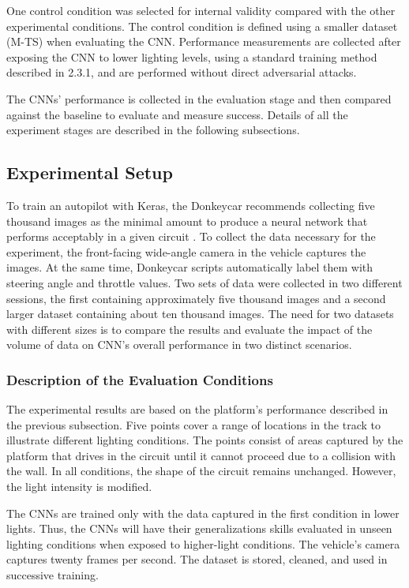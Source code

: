 \documentclass[12pt]{article}
\begin{document}
One control condition was selected for internal validity compared with the other experimental conditions. The control condition is defined using a smaller dataset (M-TS) when evaluating the CNN. Performance measurements are collected after exposing the CNN to lower lighting levels, using a standard training method described in 2.3.1, and are performed without direct adversarial attacks. 

The CNNs' performance is collected in the evaluation stage and then compared against the baseline to evaluate and measure success. Details of all the experiment stages are described in the following subsections.

\subsection{Experimental Setup}

To train an autopilot with Keras, the Donkeycar recommends collecting five thousand images as the minimal amount to produce a neural network that performs acceptably in a given circuit \parencite{donkey-keras}.  
To collect the data necessary for the experiment, the front-facing wide-angle camera in the vehicle captures the images. At the same time, Donkeycar scripts automatically label them with steering angle and throttle values. Two sets of data were collected in two different sessions, the first containing approximately five thousand images and a second larger dataset containing about ten thousand images. The need for two datasets with different sizes is to compare the results and evaluate the impact of the volume of data on CNN's overall performance in two distinct scenarios. 

\subsubsection{Description of the Evaluation Conditions}

The experimental results are based on the platform's performance described in the previous subsection. Five points cover a range of locations in the track to illustrate different lighting conditions. The points consist of areas captured by the platform that drives in the circuit until it cannot proceed due to a collision with the wall. In all conditions, the shape of the circuit remains unchanged. However, the light intensity is modified. 

The CNNs are trained only with the data captured in the first condition in lower lights. Thus, the CNNs will have their generalizations skills evaluated in unseen lighting conditions when exposed to higher-light conditions. The vehicle's camera captures twenty frames per second. The dataset is stored, cleaned, and used in successive training.
\end{document}
